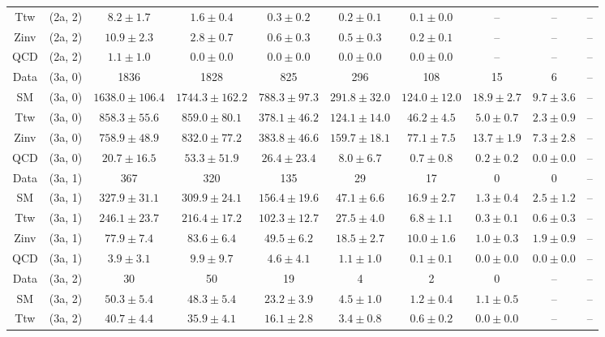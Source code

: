\begin{table}[h!]
{\begin{tabular}{cccccccccc}
	Ttw & (2a, 2) & $8.2\pm 1.7$ & $1.6\pm 0.4$ & $0.3\pm 0.2$ & $0.2\pm 0.1$ & $0.1\pm 0.0$ & -- & -- & -- \\[0.5ex] 
	Zinv & (2a, 2) & $10.9\pm 2.3$ & $2.8\pm 0.7$ & $0.6\pm 0.3$ & $0.5\pm 0.3$ & $0.2\pm 0.1$ & -- & -- & -- \\[0.5ex] 
	QCD & (2a, 2) & $1.1\pm 1.0$ & $0.0\pm 0.0$ & $0.0\pm 0.0$ & $0.0\pm 0.0$ & $0.0\pm 0.0$ & -- & -- & -- \\[0.5ex] 
	Data & (3a, 0) & 1836 & 1828 & 825 & 296 & 108 & 15 & 6 & -- \\[0.5ex] 
	SM & (3a, 0) & $1638.0\pm 106.4$ & $1744.3\pm 162.2$ & $788.3\pm 97.3$ & $291.8\pm 32.0$ & $124.0\pm 12.0$ & $18.9\pm 2.7$ & $9.7\pm 3.6$ & -- \\[0.5ex] 
	Ttw & (3a, 0) & $858.3\pm 55.6$ & $859.0\pm 80.1$ & $378.1\pm 46.2$ & $124.1\pm 14.0$ & $46.2\pm 4.5$ & $5.0\pm 0.7$ & $2.3\pm 0.9$ & -- \\[0.5ex] 
	Zinv & (3a, 0) & $758.9\pm 48.9$ & $832.0\pm 77.2$ & $383.8\pm 46.6$ & $159.7\pm 18.1$ & $77.1\pm 7.5$ & $13.7\pm 1.9$ & $7.3\pm 2.8$ & -- \\[0.5ex] 
	QCD & (3a, 0) & $20.7\pm 16.5$ & $53.3\pm 51.9$ & $26.4\pm 23.4$ & $8.0\pm 6.7$ & $0.7\pm 0.8$ & $0.2\pm 0.2$ & $0.0\pm 0.0$ & -- \\[0.5ex] 
	Data & (3a, 1) & 367 & 320 & 135 & 29 & 17 & 0 & 0 & -- \\[0.5ex] 
	SM & (3a, 1) & $327.9\pm 31.1$ & $309.9\pm 24.1$ & $156.4\pm 19.6$ & $47.1\pm 6.6$ & $16.9\pm 2.7$ & $1.3\pm 0.4$ & $2.5\pm 1.2$ & -- \\[0.5ex] 
	Ttw & (3a, 1) & $246.1\pm 23.7$ & $216.4\pm 17.2$ & $102.3\pm 12.7$ & $27.5\pm 4.0$ & $6.8\pm 1.1$ & $0.3\pm 0.1$ & $0.6\pm 0.3$ & -- \\[0.5ex] 
	Zinv & (3a, 1) & $77.9\pm 7.4$ & $83.6\pm 6.4$ & $49.5\pm 6.2$ & $18.5\pm 2.7$ & $10.0\pm 1.6$ & $1.0\pm 0.3$ & $1.9\pm 0.9$ & -- \\[0.5ex] 
	QCD & (3a, 1) & $3.9\pm 3.1$ & $9.9\pm 9.7$ & $4.6\pm 4.1$ & $1.1\pm 1.0$ & $0.1\pm 0.1$ & $0.0\pm 0.0$ & $0.0\pm 0.0$ & -- \\[0.5ex] 
	Data & (3a, 2) & 30 & 50 & 19 & 4 & 2 & 0 & -- & -- \\[0.5ex] 
	SM & (3a, 2) & $50.3\pm 5.4$ & $48.3\pm 5.4$ & $23.2\pm 3.9$ & $4.5\pm 1.0$ & $1.2\pm 0.4$ & $1.1\pm 0.5$ & -- & -- \\[0.5ex] 
	Ttw & (3a, 2) & $40.7\pm 4.4$ & $35.9\pm 4.1$ & $16.1\pm 2.8$ & $3.4\pm 0.8$ & $0.6\pm 0.2$ & $0.0\pm 0.0$ & -- & -- \\[0.5ex] 

\end{tabular}}
\end{table}
